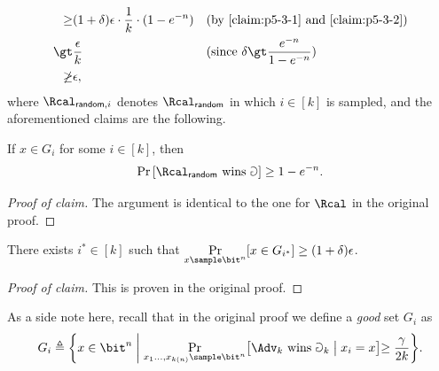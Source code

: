 \begin{answer}[iii]
\begin{align*}
        \ge& (1+\delta)\epsilon \cdot \frac{1}{k} \cdot (1-e^{-n})
        &&\textrm{(by \autoref{claim:p5-3-1} and \autoref{claim:p5-3-2})}\\
        \gt& \frac{\epsilon}{k} 
        &&(\textrm{since } \delta\gt \frac{e^{-n}}{1-e^{-n}})\\
        \not\ge& \epsilon,
    \end{align*}
    where $\Rcal_{\textsf{random},i}$ denotes $\Rcal_{\textsf{random}}$ in which $i\in [k]$ is sampled, and the aforementioned claims are the following.
    \begin{claim}\label{claim:p5-3-1}
        If $x\in G_i$ for some $i\in[k]$, then
        \[
            \Pr\left[ \Rcal_{\textsf{random}} \textrm{ wins } \Game   \right] \ge 1-e^{-n}.
        \]
    \end{claim}
    \begin{proof}[Proof of claim]
        The argument is identical to the one for $\Rcal$ in the original proof.
    \end{proof}

    \begin{claim}\label{claim:p5-3-2}
        There exists $i^\ast\in[k]$ such that $\Pr\limits_{x\sample \bit^n}[x\in G_{i^\ast}]\ge (1+\delta)\epsilon$.
    \end{claim}
    \begin{proof}[Proof of claim]
        This is proven in the original proof.
    \end{proof}

    As a side note here, recall that in the original proof we define a \textit{good} set $G_i$ as
    \[
        G_i\triangleq \biggl\{
            x\in\bit^n \biggm\vert 
            \Pr_{x_1\ldots,x_{k(n)}\sample \bit^n}\bigr[\Adv_k\textrm{ wins }\Game_k \bigm\vert x_i=x \bigl]
            \ge \frac{\gamma}{2k}
        \biggr\}.
    \]


\end{answer}
